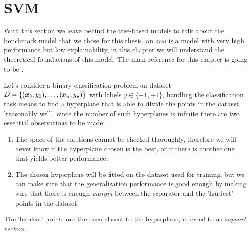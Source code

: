 \section{SVM}
\label{sec:svm}
With this section we leave behind the tree-based models to talk about the benchmark model that we
chose for this thesis, an \textsc{svm} is a model with very high performance but low explainability,
in this chapter we will understand the theoretical foundations of this model. The main reference for
this chapter is going to be \cite{ZhouZhi-Hua2021ML}.

\medskip

Let's consider a binary classification problem on dataset $D = \{(\boldsymbol{x}_0, y_0), \ldots, (\boldsymbol{x}_n, y_n)\}$ with labels $y \in \{-1, +1\}$,
handling the classification task means to find a hyperplane that is able to divide the points in the
dataset 'reasonably well', since the number of such hyperplanes is infinite there are two
essential observations to be made:
\begin{enumerate}
	\item The space of the solutions cannot be checked thoroughly, therefore we will never know
	      if the hyperplane chosen is the best, or if there is another one that yields better
	      performance.
	\item The chosen hyperplane will be fitted on the dataset used for training,
	      but we can make sure that the generalization performance is good enough by making
	      sure that there is enough \emph{margin} between the separator and the 'hardest'
	      points in the dataset.
\end{enumerate}
The 'hardest' points are the ones closest to the hyperplane, referred to as \emph{support
	vectors}.

\medskip


